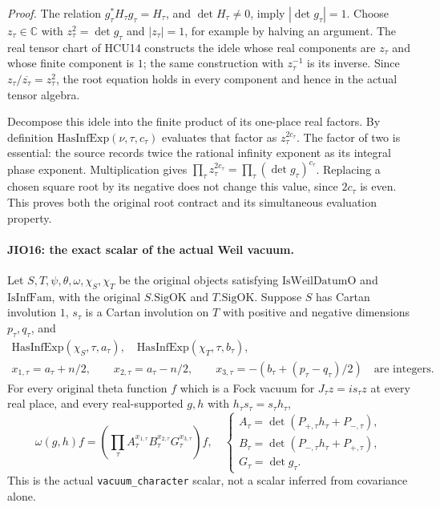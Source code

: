 \emph{Proof.}
The relation \(g_\tau^*H_\tau g_\tau=H_\tau\), and
\(\det H_\tau\ne0\), imply \(|\det g_\tau|=1\).
Choose \(z_\tau\in\mathbb C\) with
\(z_\tau^2=\det g_\tau\) and \(|z_\tau|=1\), for example by
halving an argument.  The real tensor chart of HCU14 constructs
the idele whose real components are \(z_\tau\) and whose finite
component is \(1\); the same construction with \(z_\tau^{-1}\)
is its inverse.  Since \(z_\tau/\overline{z_\tau}=z_\tau^2\),
the root equation holds in every component and hence in the
actual tensor algebra.

Decompose this idele into the finite product of its one-place
real factors.  By definition \(\mathrm{HasInfExp}(\nu,\tau,c_\tau)\)
evaluates that factor as \(z_\tau^{2c_\tau}\).
The factor of two is essential: the source records twice the
rational infinity exponent as its integral phase exponent.
Multiplication gives
\(\prod_\tau z_\tau^{2c_\tau}
 =\prod_\tau(\det g_\tau)^{c_\tau}\).
Replacing a chosen square root by its negative does not change
this value, since \(2c_\tau\) is even.  This proves both the
original root contract and its simultaneous evaluation property.

\paragraph{JIO16: the exact scalar of the actual Weil vacuum.}
\label{claim:JIO16}
Let \(S,T,\psi,\theta,\omega,\chi_S,\chi_T\) be the original
objects satisfying \(\mathrm{IsWeilDatumO}\) and
\(\mathrm{IsInfFam}\), with the original
\(S.\mathrm{SigOK}\) and \(T.\mathrm{SigOK}\).
Suppose \(S\) has Cartan involution \(1\),
\(s_\tau\) is a Cartan involution on \(T\) with positive and
negative dimensions \(p_\tau,q_\tau\), and
\[
 \begin{gathered}
 \mathrm{HasInfExp}(\chi_S,\tau,a_\tau),\quad
 \mathrm{HasInfExp}(\chi_T,\tau,b_\tau),\\
 x_{1,\tau}=a_\tau+n/2,\qquad
 x_{2,\tau}=a_\tau-n/2,\qquad
 x_{3,\tau}=-(b_\tau+(p_\tau-q_\tau)/2)
                       \quad\text{are integers}.
 \end{gathered}
 \tag{JIO.46}
\]
For every original theta function \(f\) which is a Fock vacuum
for \(J_\tau z=i s_\tau z\) at every real place, and every
real-supported \(g,h\) with \(h_\tau s_\tau=s_\tau h_\tau\),
\[
 \omega(g,h)f=
 \left(\prod_\tau A_\tau^{x_{1,\tau}}
                     B_\tau^{x_{2,\tau}}
                     G_\tau^{x_{3,\tau}}\right)f ,
 \quad
 \begin{cases}
 A_\tau=\det(P_{+,\tau}h_\tau+P_{-,\tau}),\\
 B_\tau=\det(P_{-,\tau}h_\tau+P_{+,\tau}),\\
 G_\tau=\det g_\tau.
 \end{cases}
 \tag{JIO.47}
\]
This is the actual \texttt{vacuum\_character} scalar, not a
scalar inferred from covariance alone.

